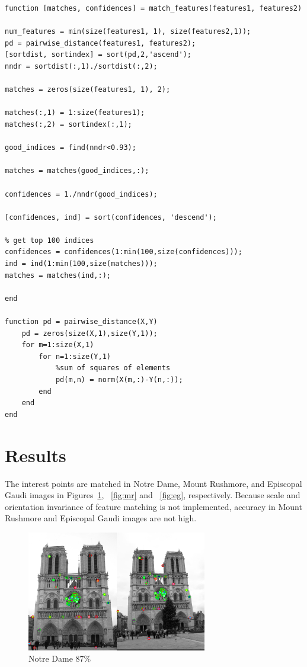 \begin{lstlisting}[style=Matlab-editor]
function [matches, confidences] = match_features(features1, features2)

num_features = min(size(features1, 1), size(features2,1));
pd = pairwise_distance(features1, features2);
[sortdist, sortindex] = sort(pd,2,'ascend');
nndr = sortdist(:,1)./sortdist(:,2);

matches = zeros(size(features1, 1), 2);

matches(:,1) = 1:size(features1);
matches(:,2) = sortindex(:,1);

good_indices = find(nndr<0.93);

matches = matches(good_indices,:); 

confidences = 1./nndr(good_indices);

[confidences, ind] = sort(confidences, 'descend');

% get top 100 indices
confidences = confidences(1:min(100,size(confidences)));
ind = ind(1:min(100,size(matches)));
matches = matches(ind,:);

end

function pd = pairwise_distance(X,Y)
    pd = zeros(size(X,1),size(Y,1));
    for m=1:size(X,1)
        for n=1:size(Y,1)
            %sum of squares of elements
            pd(m,n) = norm(X(m,:)-Y(n,:));
        end
    end
end
\end{lstlisting}

\section*{Results}

The interest points are matched in Notre Dame, Mount Rushmore, and Episcopal Gaudi images in Figures~\ref{fig:nd}, ~\ref{fig:mr} and ~\ref{fig:eg}, respectively. Because scale and orientation invariance of feature matching is not implemented, accuracy in Mount Rushmore and Episcopal Gaudi images are not high.

\begin{figure}[h!]
	\centering
	\includegraphics[width=0.7\textwidth]{../code/eval_ND.png}
	\caption{Notre Dame 87\%}
	\label{fig:nd}
\end{figure}

